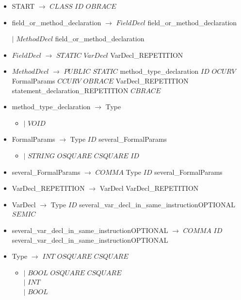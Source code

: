 \documentclass[12pt]{article}
\begin{document}
\begin{itemize}
  \item[] START $\longrightarrow$ $CLASS$ $ID$  $OBRACE$ 
  \item[]  field\_or\_method\_declaration $\longrightarrow$  $FieldDecl$ field\_or\_method\_declaration \par$|$ $MethodDecl$  field\_or\_method\_declaration 
  \item[] $FieldDecl$ $\longrightarrow$ $STATIC$ $VarDecl$  VarDecl\_REPETITION
  
  \item[] $MethodDecl$ $\longrightarrow$ $PUBLIC$ $STATIC$ method\_type\_declaration $ID$  $OCURV$ FormalParams $CCURV$ $OBRACE$ VarDecl\_REPETITION statement\_declaration\_REPETITION $CBRACE$
  
  \item[] method\_type\_declaration $\longrightarrow$ Type 
  \begin{itemize}
	\item[] $|$ $VOID$
  \end{itemize}
  
  \item[] FormalParams $\longrightarrow$ Type $ID$ several\_FormalParams 
  \begin{itemize}
 	\item[]$|$ $STRING$    $OSQUARE$ $CSQUARE$  $ID$  
  \end{itemize}
  
  \item[] several\_FormalParams $\longrightarrow$ $COMMA$ Type $ID$ several\_FormalParams  
  
  \item[] VarDecl\_REPETITION $\longrightarrow$ VarDecl VarDecl\_REPETITION 
 
  \item[] VarDecl $\longrightarrow$ Type $ID$ several\_var\_decl\_in\_same\_instructionOPTIONAL $SEMIC$
  
  \item[]several\_var\_decl\_in\_same\_instructionOPTIONAL $\longrightarrow$ $COMMA$ $ID$ several\_var\_decl\_in\_same\_instructionOPTIONAL 
  
  \item[]Type $\longrightarrow$ $INT$ $OSQUARE$ $CSQUARE$ 
  \begin{itemize}
  \item[]$|$ $BOOL$ $OSQUARE$ $CSQUARE$ 
  \\$|$ $INT$ 
  \\$|$ $BOOL$
  \end{itemize}
  

\end{itemize}
\end{document}
